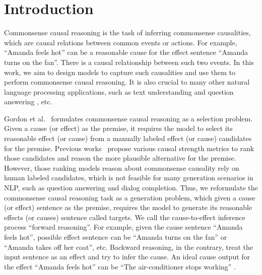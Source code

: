 \section{Introduction}
Commonsense causal reasoning is the task of inferring commonsense causalities, which are causal relations
between common events or actions. 
For example, ``Amanda feels hot'' can be a reasonable cause for the effect sentence ``Amanda turns on the fan''. 
There is a causal relationship between such two events.
In this work, we aim to design models to capture such
causalities and use them to perform commonsense 
causal reasoning.
It is also crucial to many other natural language processing applications, such as text understanding and question answering , etc.


Gordon et al.~\cite{roemmele2011choice} formulates commonsense causal reasoning as a selection problem.
Given a cause (or effect) as the premise, 
it requires the model to select its reasonable effect (or cause) 
from a manually labeled effect (or cause) candidates for the premise.
Previous works~\cite{roemmele2011choice, LuoSZHW16} propose various causal strength metrics to rank those candidates and reason the more plausible alternative for the premise.
However, those ranking models reason about commonsense causality rely on human labeled candidates, which is not feasible for many generation scenarios in NLP, such as question answering and dialog completion.
Thus, we reformulate the commonsense causal reasoning task as a generation problem, which given a cause (or effect) sentence as the premise, requires the model to generate its reasonable effects (or causes) sentence called targets. 
We call the cause-to-effect inference process ``forward reasoning''. For example, given the cause sentence ``Amanda feels hot'', possible effect sentence can be ``Amanda turns on the fan'' or ``Amanda takes off her coat'', etc. Backward reasoning, in the contrary, treat the input sentence as an effect and try to infer the cause. An ideal cause output for the effect ``Amanda feels hot'' can be ``The air-conditioner stops working'' .

